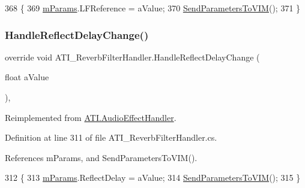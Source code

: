 \begin{DoxyCode}
368     \{
369         \hyperlink{class_a_t_i___reverb_filter_handler_a034260fbce2052b42bceddc891632347}{mParams}.LFReference = aValue;
370         \hyperlink{class_a_t_i___reverb_filter_handler_aacb469dc3038fca616d638f6a5a04a30}{SendParametersToVIM}();
371     \}
\end{DoxyCode}
\mbox{\label{class_a_t_i___reverb_filter_handler_a83de9c38851424d66456dfe98163dfde}} 
\subsubsection{\texorpdfstring{Handle\+Reflect\+Delay\+Change()}{HandleReflectDelayChange()}}
{\footnotesize\ttfamily override void A\+T\+I\+\_\+\+Reverb\+Filter\+Handler.\+Handle\+Reflect\+Delay\+Change (\begin{DoxyParamCaption}\item[{float}]{a\+Value }\end{DoxyParamCaption})\hspace{0.3cm}{\ttfamily [protected]}, {\ttfamily [virtual]}}



Reimplemented from \hyperlink{class_a_t_i_1_1_audio_effect_handler_ada336ed04fdb3360de3026ba8659c409}{A\+T\+I.\+Audio\+Effect\+Handler}.



Definition at line 311 of file A\+T\+I\+\_\+\+Reverb\+Filter\+Handler.\+cs.



References m\+Params, and Send\+Parameters\+To\+V\+I\+M().


\begin{DoxyCode}
312     \{
313         \hyperlink{class_a_t_i___reverb_filter_handler_a034260fbce2052b42bceddc891632347}{mParams}.ReflectDelay = aValue;
314         \hyperlink{class_a_t_i___reverb_filter_handler_aacb469dc3038fca616d638f6a5a04a30}{SendParametersToVIM}();
315     \}
\end{DoxyCode}
\mbox{\label{class_a_t_i___reverb_filter_handler_a8db38f7eafd2b1ed0a5f8d488244d83a}} 
